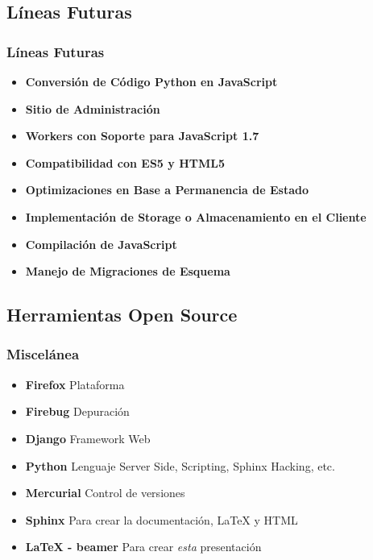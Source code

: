 \documentclass{beamer}
\begin{document}
\subsection{Líneas Futuras}
\begin{frame}
    \frametitle{Líneas Futuras}
    \begin{itemize}
        \item {\bf Conversión de Código Python en JavaScript}
        \item {\bf Sitio de Administración}
        \item {\bf Workers con Soporte para JavaScript 1.7}
        \item {\bf Compatibilidad con ES5 y HTML5}
        \item {\bf Optimizaciones en Base a Permanencia de Estado}
        \item {\bf Implementación de Storage o Almacenamiento en el Cliente}
        \item {\bf Compilación de JavaScript}
        \item {\bf Manejo de Migraciones de Esquema}
    \end{itemize}
\end{frame}

\subsection{Herramientas Open Source}
\begin{frame}
    \frametitle{Miscelánea}
    \begin{itemize}
        \item {\bf Firefox} Plataforma
        \item {\bf Firebug} Depuración
        \item {\bf Django} Framework Web
        \item {\bf Python} Lenguaje Server Side, Scripting, Sphinx Hacking, etc.
        \item {\bf Mercurial} Control de versiones
        \item {\bf Sphinx} Para crear la documentación, \LaTeX{} y HTML
        \item {\bf \LaTeX{} - beamer} Para crear {\it esta} presentación
    \end{itemize}
\end{frame}
\end{document}
